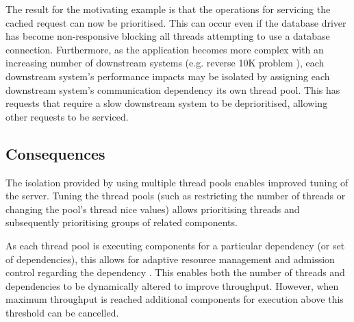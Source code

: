 \documentclass[prodmode]{style/acmlarge}
\begin{document}
\begin{table}[t]
\label{tab:example_request_thread_pools}
\end{table}

The result for the motivating example is that the operations for servicing the
cached request can now be prioritised.  This can occur even if the database
driver has become non-responsive blocking all threads attempting to use a
database connection.  Furthermore, as the application becomes more complex with
an increasing number of downstream systems (e.g. reverse 10K problem
\cite{reverse-ten-k-problem}), each downstream system's performance impacts may
be isolated by assigning each downstream system's communication dependency its
own thread pool.  This has requests that require a slow downstream system to be
deprioritised, allowing other requests to be serviced.


\subsection{Consequences}

The isolation provided by using multiple thread pools enables improved tuning of
the server.  Tuning the thread pools (such as restricting the number of threads
or changing the pool's thread nice values) allows prioritising threads and
subsequently prioritising groups of related components.

As each thread pool is executing components for a particular dependency (or set
of dependencies), this allows for adaptive resource management and admission
control regarding the dependency \cite{seda}.  This enables both the number of
threads and dependencies to be dynamically altered to improve throughput.
However, when maximum throughput is reached additional components for execution
above this threshold can be cancelled.
\end{document}
